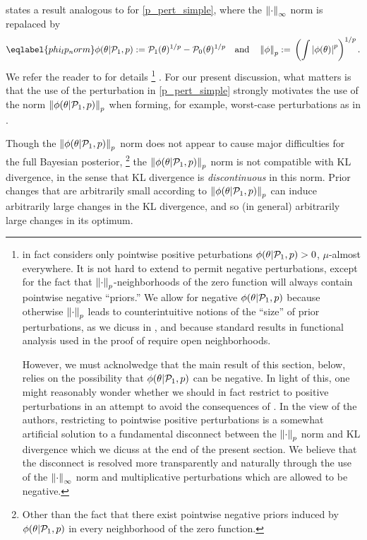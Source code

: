 \citet[Result 2]{gustafson:1996:local} states
a result analogous to  for \eqref{p_pert_simple}, where
the $\left\Vert\cdot\right\Vert_{\infty}$ norm is repalaced by
%
\begin{align}\eqlabel{phi_lp_norm}
%
\phi(\theta \vert \palt, p) :={}
    \palt(\theta)^{1/p} - \pbase(\theta)^{1/p} \mathand
\norm{\phi}_p :={} \left(\int \abs{\phi(\theta)}^p \right)^{1/p}.
%
\end{align}
%
We refer the reader to \citet{gustafson:1996:local} for details
%
\footnote{\citet{gustafson:1996:local} in fact considers only pointwise positive
peturbations $\phi(\theta \vert \mathcal{P}_{1}, p) > 0$, $\mu$-almost everywhere.  It is
not hard to extend  \citet[Result
2]{gustafson:1996:local} to permit negative perturbations, except for the fact
that $\left\Vert\cdot\right\Vert_p$-neighborhoods of the zero function will always contain
pointwise negative ``priors.''
%
We allow for negative $\phi(\theta \vert \mathcal{P}_{1}, p)$ because otherwise
$\left\Vert\cdot\right\Vert_p$ leads to counterintuitive notions of the ``size'' of prior
perturbations, as we dicuss in , and because standard
results in functional analysis used in the proof of 
require open neighborhoods.

However, we must acknolwedge that the main result of this section,
 below, relies on the possibility that $\phi(\theta
\vert \mathcal{P}_{1}, p)$ can be negative.   In light of this, one might reasonably
wonder whether we should in fact restrict to positive perturbations in an
attempt to avoid the consequences of . In the view of
the authors, restricting to pointwise positive perturbations is a somewhat
artificial solution to a fundamental disconnect between the $\left\Vert\cdot\right\Vert_p$
norm and KL divergence which we dicuss at the end of the present section. We
believe that the disconnect is resolved more transparently and naturally through
the use of the $\left\Vert\cdot\right\Vert_{\infty}$ norm and multiplicative perturbations which are
allowed to be negative.}
%
.  For our present discussion, what matters is that the use of the perturbation
in \eqref{p_pert_simple} strongly motivates the use of the norm
$\left\Vert\phi(\theta \vert \mathcal{P}_{1}, p)\right\Vert_p$ when forming, for example, worst-case
perturbations as in .

Though the $\left\Vert\phi(\theta \vert \mathcal{P}_{1}, p)\right\Vert_p$ norm does not appear to cause
major difficulties for the full Bayesian posterior,
%
\footnote{Other than the fact that there exist pointwise negative priors
induced by $\phi(\theta \vert \mathcal{P}_{1}, p)$ in every neighborhood of the
zero function.}
%
the $\left\Vert\phi(\theta \vert \mathcal{P}_{1}, p)\right\Vert_p$ norm is not compatible with KL
divergence, in the sense that KL divergence is {\em discontinuous} in this norm.
Prior changes that are arbitrarily small according to $\left\Vert\phi(\theta \vert
\mathcal{P}_{1}, p)\right\Vert_p$ can induce arbitrarily large changes in the KL divergence, and so
(in general) arbitrarily large changes in its optimum.

